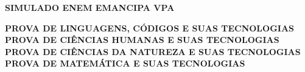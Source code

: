 \begin{titlepage}

\begin{center}

{\Huge \textbf{SIMULADO ENEM EMANCIPA VPA}}

\vspace{2mm}

{\Large \textbf{PROVA DE LINGUAGENS, CÓDIGOS E SUAS TECNOLOGIAS}}\\
\vspace{2mm}
{\Large \textbf{PROVA DE CIÊNCIAS HUMANAS E SUAS TECNOLOGIAS}}\\
\vspace{2mm}
{\Large \textbf{PROVA DE CIÊNCIAS DA NATUREZA E SUAS TECNOLOGIAS}}\\
\vspace{2mm}
{\Large \textbf{PROVA DE MATEMÁTICA E SUAS TECNOLOGIAS}}\\
    
\end{center}

\end{titlepage}
